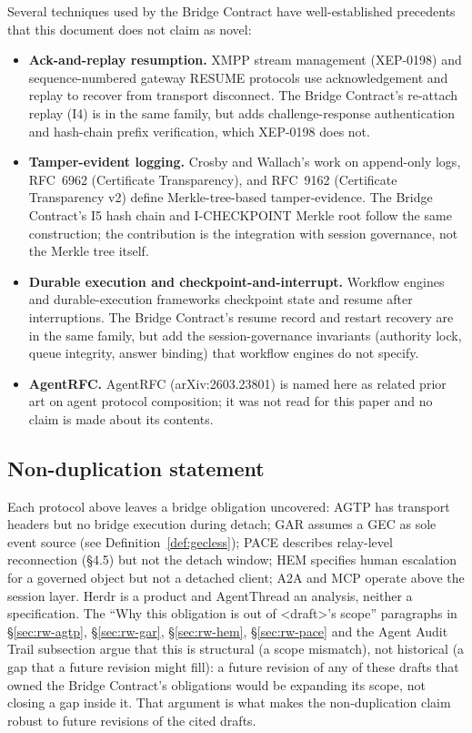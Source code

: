 Several techniques used by the Bridge Contract have well-established
precedents that this document does not claim as novel:

\begin{itemize}[leftmargin=2em]
\item \textbf{Ack-and-replay resumption.} XMPP stream management
(XEP-0198) and sequence-numbered gateway RESUME protocols use
acknowledgement and replay to recover from transport disconnect.
The Bridge Contract's re-attach replay (I4) is in the same family,
but adds challenge-response authentication and hash-chain prefix
verification, which XEP-0198 does not.
\item \textbf{Tamper-evident logging.} Crosby and Wallach's
work on append-only logs, RFC~6962 (Certificate Transparency), and
RFC~9162 (Certificate Transparency v2) define Merkle-tree-based
tamper-evidence. The Bridge Contract's I5 hash chain and
I-CHECKPOINT Merkle root follow the same construction; the
contribution is the integration with session governance, not the
Merkle tree itself.
\item \textbf{Durable execution and checkpoint-and-interrupt.}
Workflow engines and durable-execution frameworks checkpoint state
and resume after interruptions. The Bridge Contract's resume record
and restart recovery are in the same family, but add the
session-governance invariants (authority lock, queue integrity,
answer binding) that workflow engines do not specify.
\item \textbf{AgentRFC.} AgentRFC (arXiv:2603.23801) is named here
as related prior art on agent protocol composition; it was not read
for this paper and no claim is made about its contents.
\end{itemize}

\subsection{Non-duplication statement}

Each protocol above leaves a bridge obligation uncovered: AGTP has
transport headers but no bridge execution during detach; GAR assumes a
GEC as sole event source (see Definition~\ref{def:gecless}); PACE describes relay-level
reconnection (\S 4.5) but not the detach window; HEM specifies human escalation for a
governed object but not a detached client; A2A and MCP operate above the
session layer. Herdr is a product and AgentThread an analysis, neither a
specification. The ``Why this obligation is out of <draft>'s scope''
paragraphs in \S\ref{sec:rw-agtp}, \S\ref{sec:rw-gar},
\S\ref{sec:rw-hem}, \S\ref{sec:rw-pace} and the Agent Audit Trail
subsection argue that this is structural (a scope mismatch), not
historical (a gap that a future revision might fill): a future
revision of any of these drafts that owned the Bridge Contract's
obligations would be expanding its scope, not closing a gap inside
it. That argument is what makes the non-duplication claim robust to
future revisions of the cited drafts.

